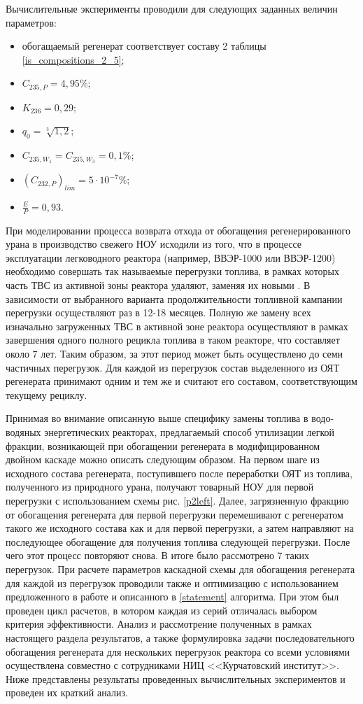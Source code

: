 Вычислительные эксперименты проводили для следующих заданных величин параметров: 

\begin{itemize}
    \item обогащаемый регенерат соответствует составу 2 таблицы \ref{is_compositions_2_5};
    \item $C_{235,{P}}=4,95\%$;
    \item $K_{236}=0,29$;
    \item $q_{0} = \sqrt[3]{1,2}$;
    \item $C_{235,{W_1}}=C_{235,{W_3}}=0,1\%$;
    \item ${(C_{232,P})}_{lim}=5\cdot10^{-7}\%$;
    \item $\frac{E}{P}=0,93$.
\end{itemize}

При моделировании процесса возврата отхода от обогащения регенерированного урана в производство свежего НОУ исходили из того, что в процессе эксплуатации легководного реактора (например, ВВЭР-1000 или ВВЭР-1200) необходимо совершать так называемые перегрузки топлива, в рамках которых часть ТВС из активной зоны реактора удаляют, заменяя их новыми \cite{острейковскийEkspluataciyaAtomnyhStanciy1999}. В зависимости от выбранного варианта продолжительности топливной кампании перегрузки осуществляют раз в 12-18 месяцев. Полную же замену всех изначально загруженных ТВС в активной зоне реактора осуществляют в рамках завершения одного полного рецикла топлива в таком реакторе, что составляет около 7 лет. Таким образом, за этот период может быть осуществлено до семи частичных перегрузок. Для каждой из перегрузок состав выделенного из ОЯТ регенерата принимают одним и тем же и считают его составом, соответствующим текущему рециклу.

Принимая во внимание описанную выше специфику замены топлива в водо-водяных энергетических реакторах, предлагаемый способ утилизации легкой фракции, возникающей при обогащении регенерата в модифицированном двойном каскаде можно описать следующим образом. На первом шаге из исходного состава регенерата, поступившего после переработки ОЯТ из топлива, полученного из природного урана, получают товарный НОУ для первой перегрузки с использованием схемы рис. \ref{p2left}. Далее, загрязненную фракцию от обогащения регенерата для первой перегрузки перемешивают с регенератом такого же исходного состава как и для первой перегрузки, а затем направляют на последующее обогащение для получения топлива следующей перегрузки. После чего этот процесс повторяют снова. В итоге было рассмотрено 7 таких перегрузок. При расчете параметров каскадной схемы для обогащения регенерата для каждой из перегрузок проводили также и оптимизацию с использованием предложенного в работе и описанного в \ref{statement} алгоритма. При этом был проведен цикл расчетов, в котором каждая из серий отличалась выбором критерия эффективности. Анализ и рассмотрение полученных в рамках настоящего раздела результатов, а также формулировка задачи последовательного обогащения регенерата для нескольких перегрузок реактора со всеми условиями осуществлена совместно с сотрудниками НИЦ <<Курчатовский институт>>. Ниже представлены результаты проведенных вычислительных экспериментов и проведен их краткий анализ.

